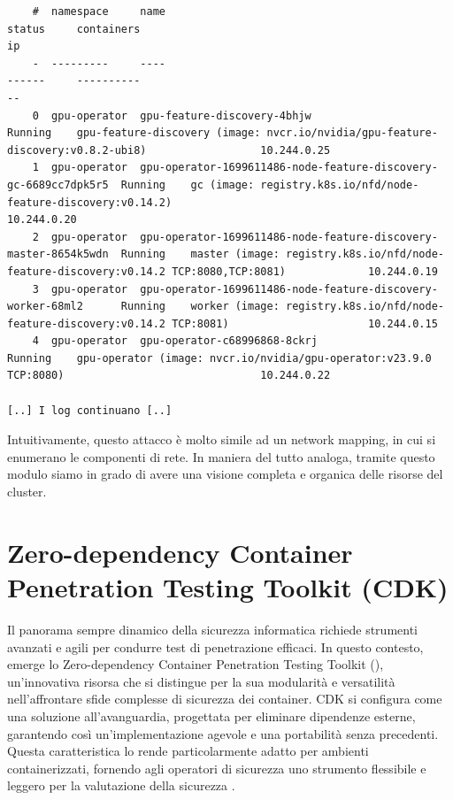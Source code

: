 \begin{code}
\begin{verbatim}
    #  namespace     name                                                             status     containers                                                                                       ip
    -  ---------     ----                                                             ------     ----------                                                                                       --
    0  gpu-operator  gpu-feature-discovery-4bhjw                                      Running    gpu-feature-discovery (image: nvcr.io/nvidia/gpu-feature-discovery:v0.8.2-ubi8)                  10.244.0.25
    1  gpu-operator  gpu-operator-1699611486-node-feature-discovery-gc-6689cc7dpk5r5  Running    gc (image: registry.k8s.io/nfd/node-feature-discovery:v0.14.2)                                   10.244.0.20
    2  gpu-operator  gpu-operator-1699611486-node-feature-discovery-master-8654k5wdn  Running    master (image: registry.k8s.io/nfd/node-feature-discovery:v0.14.2 TCP:8080,TCP:8081)             10.244.0.19
    3  gpu-operator  gpu-operator-1699611486-node-feature-discovery-worker-68ml2      Running    worker (image: registry.k8s.io/nfd/node-feature-discovery:v0.14.2 TCP:8081)                      10.244.0.15
    4  gpu-operator  gpu-operator-c68996868-8ckrj                                     Running    gpu-operator (image: nvcr.io/nvidia/gpu-operator:v23.9.0 TCP:8080)                               10.244.0.22

[..] I log continuano [..]
\end{verbatim}
\end{code}

Intuitivamente, questo attacco è molto simile ad un network mapping, in cui si enumerano le componenti di rete. In maniera del tutto analoga, tramite questo modulo siamo in grado di avere una visione completa e organica delle risorse del cluster.

\section{Zero-dependency Container Penetration Testing Toolkit (CDK)}

Il panorama sempre dinamico della sicurezza informatica richiede strumenti avanzati e agili per condurre test di penetrazione efficaci. In questo contesto, emerge lo Zero-dependency Container Penetration Testing Toolkit (), un'innovativa risorsa che si distingue per la sua modularità e versatilità nell'affrontare sfide complesse di sicurezza dei container. CDK si configura come una soluzione all'avanguardia, progettata per eliminare dipendenze esterne, garantendo così un'implementazione agevole e una portabilità senza precedenti. Questa caratteristica lo rende particolarmente adatto per ambienti containerizzati, fornendo agli operatori di sicurezza uno strumento flessibile e leggero per la valutazione della sicurezza \cite{cdk_overview}.

